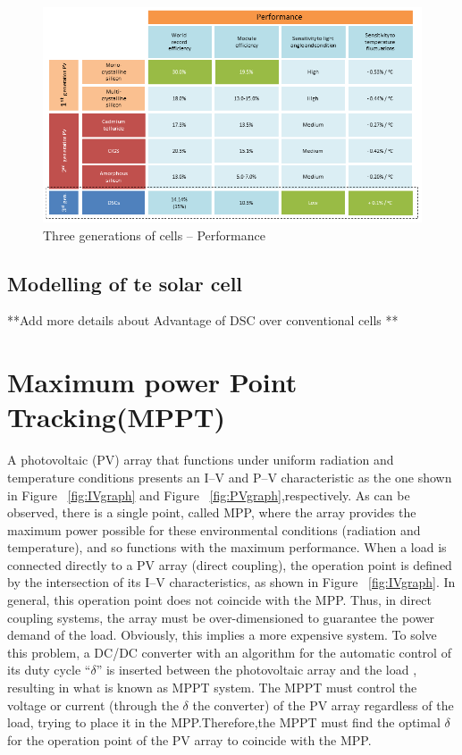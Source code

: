   
  \begin{figure}[H]
  \begin{center}
  \includegraphics[width=\textwidth]{images/3rd_gen}
  \caption{ Three generations of cells –  Performance}
  \label{fig:3rd_gen}
  \end{center}
  \end{figure}
 
 \subsection{Modelling of te solar cell } 
  **Add more details about Advantage of DSC over conventional cells **\\
 
   
\section{Maximum power Point Tracking(MPPT)}

A photovoltaic (PV) array that functions under uniform radiation and temperature conditions presents an I–V and P–V characteristic as the one shown in Figure ~\ref{fig:IVgraph} and Figure ~\ref{fig:PVgraph},respectively. As can be observed, there is a single point, called \ac{MPP}, where the array provides the maximum power possible for these environmental conditions (radiation and temperature), and so functions with the maximum performance. When a load is connected directly to a PV array (direct coupling), the operation point is defined by the intersection of its I–V characteristics, as shown in Figure ~\ref{fig:IVgraph}. In general, this operation point does not coincide with the \ac{MPP}. Thus, in direct coupling systems, the array must be over-dimensioned to guarantee the power demand of the load. Obviously, this implies a more expensive system. To solve this problem, a DC/DC  converter with an algorithm for the automatic control of its duty cycle “${\delta}$” is inserted between the photovoltaic array and the load , resulting in what is known as \ac{MPPT} system. The MPPT must control the voltage or current (through the ${\delta}$ the converter) of the PV array regardless of the load, trying to place it in the \ac{MPP}.Therefore,the MPPT must find the optimal ${\delta}$ for the operation point of the PV array to coincide with the \ac{MPP}\cite{enrique2010reliable}.\\


